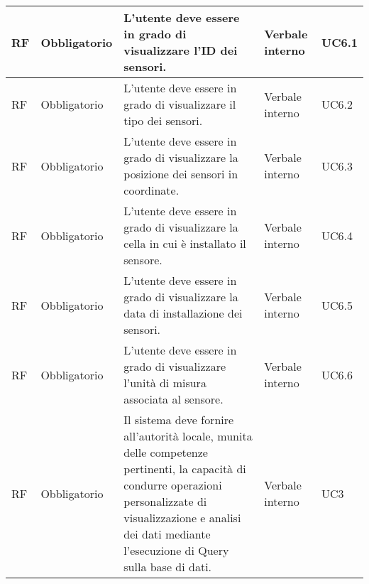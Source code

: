 \begin{longtable}{|C{1cm}|C{2cm}|>{\raggedright}m{5cm}|C{2cm}|C{1.5cm}|}
    \hline
     RF & Obbligatorio        & L'utente deve essere in grado di visualizzare l'ID dei sensori.                                                                                                                                                                    & Verbale interno      & UC6.1               \\
    \hline
     RF & Obbligatorio        & L'utente deve essere in grado di visualizzare il tipo dei sensori.                                                                                                                                                                 & Verbale interno      & UC6.2               \\
    \hline
     RF & Obbligatorio        & L'utente deve essere in grado di visualizzare la posizione dei sensori in coordinate.                                                                                                                                                            & Verbale interno      & UC6.3               \\
    \hline
     RF & Obbligatorio        & L'utente deve essere in grado di visualizzare la cella in cui è installato il sensore.                                                                                                                                                & Verbale interno      & UC6.4               \\
    \hline
     RF & Obbligatorio        & L'utente deve essere in grado di visualizzare la data di installazione dei sensori.                                                                                                                                                & Verbale interno      & UC6.5               \\
    \hline
     RF & Obbligatorio        & L'utente deve essere in grado di visualizzare l'unità di misura associata al sensore.                                                                                                                                              & Verbale interno      & UC6.6               \\
    \hline
     RF & Obbligatorio        & Il sistema deve fornire all'autorità locale, munita delle competenze pertinenti, la capacità di condurre operazioni personalizzate di visualizzazione e analisi dei dati mediante l'esecuzione di Query sulla base di dati.    & Verbale interno      & UC3               \\
    \hline
    
\end{longtable}


